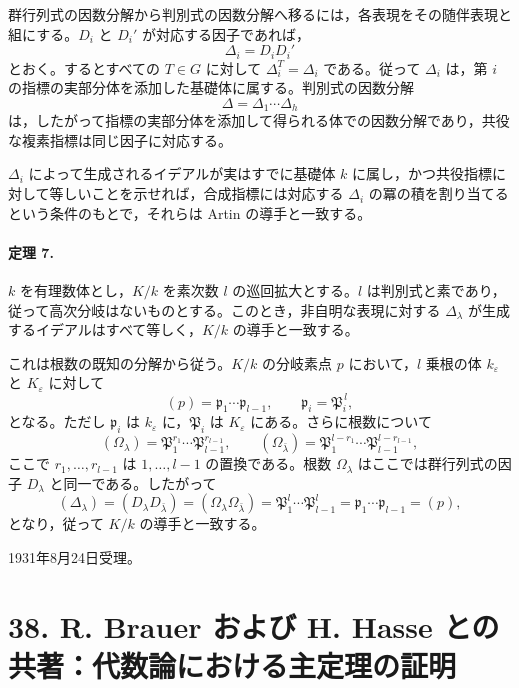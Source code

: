 群行列式の因数分解から判別式の因数分解へ移るには，各表現をその随伴表現と組にする。\(D_i\) と \(D_i'\) が対応する因子であれば，
\[
        \Delta_i=D_iD_i'
\]
とおく。するとすべての \(T\in G\) に対して \(\Delta_i^T=\Delta_i\) である。従って \(\Delta_i\) は，第 \(i\) の指標の実部分体を添加した基礎体に属する。判別式の因数分解
\[
        \Delta=\Delta_1\cdots\Delta_h
\]
は，したがって指標の実部分体を添加して得られる体での因数分解であり，共役な複素指標は同じ因子に対応する。

\(\Delta_i\) によって生成されるイデアルが実はすでに基礎体 \(k\) に属し，かつ共役指標に対して等しいことを示せれば，合成指標には対応する \(\Delta_i\) の冪の積を割り当てるという条件のもとで，それらは Artin の導手と一致する。

\paragraph{定理 7.}
\(k\) を有理数体とし，\(K/k\) を素次数 \(l\) の巡回拡大とする。\(l\) は判別式と素であり，従って高次分岐はないものとする。このとき，非自明な表現に対する \(\Delta_\lambda\) が生成するイデアルはすべて等しく，\(K/k\) の導手と一致する。

これは根数の既知の分解から従う。\(K/k\) の分岐素点 \(p\) において，\(l\) 乗根の体 \(k_\varepsilon\) と \(K_\varepsilon\) に対して
\[
        (p)=\mathfrak p_1\cdots\mathfrak p_{l-1},\qquad
        \mathfrak p_i=\mathfrak P_i^{\,l},
\]
となる。ただし \(\mathfrak p_i\) は \(k_\varepsilon\) に，\(\mathfrak P_i\) は \(K_\varepsilon\) にある。さらに根数について
\[
        (\Omega_\lambda)=\mathfrak P_1^{r_1}\cdots
        \mathfrak P_{l-1}^{r_{l-1}},
        \qquad
        (\Omega_{\bar\lambda})=
        \mathfrak P_1^{l-r_1}\cdots \mathfrak P_{l-1}^{l-r_{l-1}},
\]
ここで \(r_1,\ldots,r_{l-1}\) は \(1,\ldots,l-1\) の置換である。根数 \(\Omega_\lambda\) はここでは群行列式の因子 \(D_\lambda\) と同一である。したがって
\[
        (\Delta_\lambda)=(D_\lambda D_{\bar\lambda})
        =(\Omega_\lambda\Omega_{\bar\lambda})
        =\mathfrak P_1^l\cdots\mathfrak P_{l-1}^l
        =\mathfrak p_1\cdots\mathfrak p_{l-1}
        =(p),
\]
となり，従って \(K/k\) の導手と一致する。

\begin{center}
1931年8月24日受理。
\end{center}

\section*{38. R. Brauer および H. Hasse との共著：代数論における主定理の証明}

